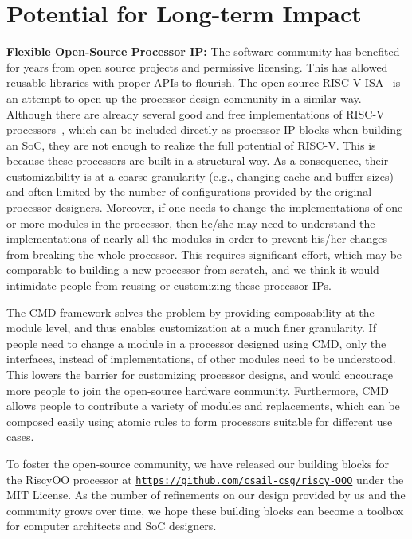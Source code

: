 \documentclass[conference]{IEEEtran}
\begin{document}
\section{Potential for Long-term Impact}

\noindent\textbf{Flexible Open-Source Processor IP:}
The software community has benefited for years from open source projects and permissive licensing. 
This has allowed reusable libraries with proper APIs to flourish. 
The open-source RISC-V ISA~\cite{riscv} is an attempt to open up the processor design community in a similar way.
Although there are already several good and free implementations of RISC-V processors~\cite{rocketchip,boom,pulp}, which can be included directly as processor IP blocks when building an SoC, they are not enough to realize the full potential of RISC-V.
This is because these processors are built in a structural way.
As a consequence, their customizability is at a coarse granularity (e.g., changing cache and buffer sizes) and often limited by the number of configurations provided by the original processor designers.
Moreover, if one needs to change the implementations of one or more modules in the processor, then he/she may need to understand the implementations of nearly all the modules in order to prevent his/her changes from breaking the whole processor.
This requires significant effort, which may be comparable to building a new processor from scratch, and we think it would intimidate people from reusing or customizing these processor IPs.

The CMD framework solves the problem by providing composability at the module level, and thus enables customization at a much finer granularity.
If people need to change a module in a processor designed using CMD, only the interfaces, instead of implementations, of other modules need to be understood.
This lowers the barrier for customizing processor designs, and would encourage more people to join the open-source hardware community.
Furthermore, CMD allows people to contribute a variety of modules and replacements, which can be composed easily using atomic rules to form processors suitable for different use cases.

To foster the open-source community, we have released our building blocks for the RiscyOO processor at \texttt{\url{https://github.com/csail-csg/riscy-OOO}} under the MIT License.
As the number of refinements on our design provided by us and the community grows over time, we hope these building blocks can become a toolbox for computer architects and SoC designers.
\end{document}

